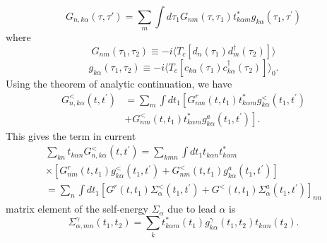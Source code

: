 \documentclass[aps,prb,superscriptaddress]{revtex4-2}
\begin{document}
\begin{equation}
G_{n,k\alpha}(\tau,\tau')=\sum_{m} \int d \tau_{1} G_{n m}\left(\tau, \tau_{1}\right) t_{k \alpha m}^{*} g_{k \alpha}\left(\tau_{1}, \tau^{\prime}\right)
\end{equation}
where
\begin{equation}
G_{n m}\left(\tau_{1}, \tau_{2}\right) \equiv-i \langle T_{c} \left[d_{n} \left(\tau_{1}\right) d_{m}^{\dagger}\left(\tau_{2}\right)\right]\rangle
\end{equation}
\begin{equation}
g_{k \alpha}\left(\tau_{1}, \tau_{2}\right) \equiv-i \langle T_{c}\left[c_{k \alpha}\left(\tau_{1}\right) c_{k \alpha}^{\dagger}\left(\tau_{2}\right)\right] \rangle_{0}.
\end{equation}
Using the theorem of analytic continuation, we have
\begin{equation}
\begin{aligned}
G_{n, k \alpha}^{<}\left(t, t^{\prime}\right) &=\sum_{m} \int d t_{1}\left[G_{n m}^{r}\left(t, t_{1}\right) t_{k \alpha m}^{*} g_{k \alpha}^{<}\left(t_{1}, t^{\prime}\right)\right.\\
&\left.+G_{n m}^{<}\left(t, t_{1}\right) t_{k \alpha m}^{*} g_{k \alpha}^{a}\left(t_{1}, t^{\prime}\right)\right].
\end{aligned}
\end{equation}
This gives the term in current
\begin{equation}
\begin{array}{l}
\sum_{kn} t_{k \alpha n} G_{n, k \alpha}^{<}\left(t, t^{\prime}\right)=\sum_{k mn} \int d t_{1} t_{k \alpha n} t_{k \alpha m}^{*} \\
\times\left[G_{n m}^{r}\left(t, t_{1}\right) g_{k \alpha}^{<}\left(t_{1}, t^{\prime}\right)+G_{n m}^{<}\left(t, t_{1}\right) g_{k \alpha}^{a}\left(t_{1}, t^{\prime}\right)\right] \\
=\sum_{n}\int d t_{1}\left[G^{r}\left(t, t_{1}\right) \Sigma_{\alpha}^{<}\left(t_{1}, t^{\prime}\right)+G^{<}\left(t, t_{1}\right) \Sigma_{\alpha}^{a}\left(t_{1}, t^{\prime}\right)\right]_{n n}
\end{array}
\label{eq:term1}
\end{equation}
matrix element of the self-energy $\Sigma_{\alpha}$ due to lead $\alpha$ is
\begin{equation}
\Sigma_{\alpha,mn}^{\gamma}(t_{1}, t_{2}) = \sum_{k} t_{k\alpha m}^{*}(t_{1}) g_{k\alpha}^{\gamma}(t_{1}, t_{2}) t_{k\alpha n}(t_{2}).
\end{equation}
\end{document}
